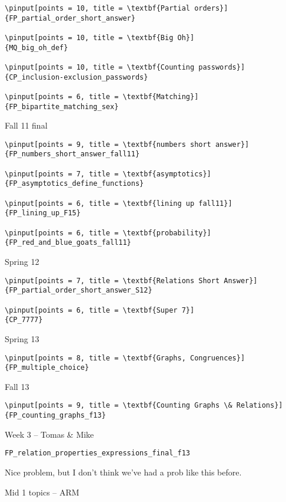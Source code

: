 \documentclass[quiz]{mcs}
\begin{document}
\begin{staffnotes}
\begin{verbatim}
\pinput[points = 10, title = \textbf{Partial orders}]
{FP_partial_order_short_answer}

\pinput[points = 10, title = \textbf{Big Oh}]
{MQ_big_oh_def}

\pinput[points = 10, title = \textbf{Counting passwords}]
{CP_inclusion-exclusion_passwords}

\pinput[points = 6, title = \textbf{Matching}]
{FP_bipartite_matching_sex}
\end{verbatim}

Fall 11 final

\begin{verbatim}
\pinput[points = 9, title = \textbf{numbers short answer}]
{FP_numbers_short_answer_fall11}

\pinput[points = 7, title = \textbf{asymptotics}]
{FP_asymptotics_define_functions}

\pinput[points = 6, title = \textbf{lining up fall11}]
{FP_lining_up_F15}

\pinput[points = 6, title = \textbf{probability}]
{FP_red_and_blue_goats_fall11}
\end{verbatim}

Spring 12

\begin{verbatim}
\pinput[points = 7, title = \textbf{Relations Short Answer}]
{FP_partial_order_short_answer_S12}

\pinput[points = 6, title = \textbf{Super 7}]
{CP_7777}
\end{verbatim}

Spring 13

\begin{verbatim}
\pinput[points = 8, title = \textbf{Graphs, Congruences}]
{FP_multiple_choice}
\end{verbatim}

Fall 13

\begin{verbatim}
\pinput[points = 9, title = \textbf{Counting Graphs \& Relations}]
{FP_counting_graphs_f13}
\end{verbatim}

\begin{center}
{\large Week 3 -- Tomas \& Mike}
\end{center}
\begin{verbatim}
FP_relation_properties_expressions_final_f13
\end{verbatim}
Nice problem, but I don't think we've had a prob like this before.

\begin{center}
{\large Mid 1 topics -- ARM }
\end{center}


\end{staffnotes}
\end{document}
